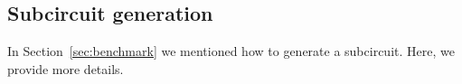 \begin{appendices}
 
 





 
\section{Subcircuit generation}
\label{sssec:circuittemplate}
In Section~\ref{sec:benchmark} we mentioned how to generate a subcircuit. Here, we provide more details.




\end{appendices}
